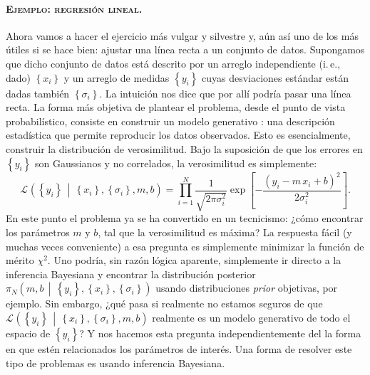 \documentclass[a4paper,twoside]{article}
\newcommand{\pos}[2]{\ensuremath{\pi_N\left(#1\,\middle|\, #2\right)}\xspace}
\newcommand{\lik}[3][]{\ensuremath{\mathcal{L}_{#1}\left(#2\,\middle|\, #3\right)}\xspace}
\newcommand{\set}[1]{\ensuremath{\left\{#1\right\}}\xspace}
\begin{document}

\paragraph{\textsc{\color{Blue}Ejemplo: regresión lineal.}} Ahora vamos a hacer el ejercicio más
vulgar y silvestre y, aún así uno de los más útiles si se hace bien: ajustar una línea recta a un
conjunto de datos. Supongamos que dicho conjunto de datos está descrito por un arreglo independiente
(i.\,e., dado) $\set{x_i}$ y un arreglo de medidas $\set{y_i}$ cuyas desviaciones estándar están
dadas también $\set{\sigma_i}$.
La intuición nos dice que por allí podría pasar una línea recta. La forma más objetiva de plantear
el problema, desde el punto de vista probabilístico, consiste en construir un modelo generativo
\citep{Hogg2010}: una descripción estadística que permite reproducir los datos observados. Esto es
esencialmente, construir la distribución de verosimilitud. Bajo la suposición de que los errores en
$\set{y_i}$ son Gaussianos y no correlados, la verosimilitud es simplemente:
%
$$\lik{\set{y_i}}{\set{x_i},\set{\sigma_i},m,b} = \prod_{i=1}^N\frac{1}{\sqrt{2\pi\sigma_i^2}}\exp{\left[-\frac{\left(y_i-m\,x_i+b\right)^2}{2\sigma_i^2}\right]}.$$
%
En este punto el problema ya se ha convertido en un tecnicismo: ¿cómo encontrar los parámetros $m$
y $b$, tal que la verosimilitud es máxima? La respuesta fácil (y muchas veces conveniente) a esa
pregunta es simplemente minimizar la función de mérito $\chi^2$.
Uno podría, sin razón lógica aparente, simplemente ir directo a la inferencia Bayesiana y encontrar
la distribución posterior $\pos{m,b}{\set{y_i},\set{x_i},\set{\sigma_i}}$ usando distribuciones
\emph{prior} objetivas, por ejemplo.
Sin embargo, ¿qué pasa si realmente no estamos seguros de que
$\lik{\set{y_i}}{\set{x_i},\set{\sigma_i},m,b}$ realmente es un modelo generativo de todo el
espacio de $\set{y_i}$? Y nos hacemos esta pregunta independientemente del la forma en que estén
relacionados los parámetros de interés.
Una forma de resolver este tipo de problemas es usando inferencia Bayesiana.
\end{document}
